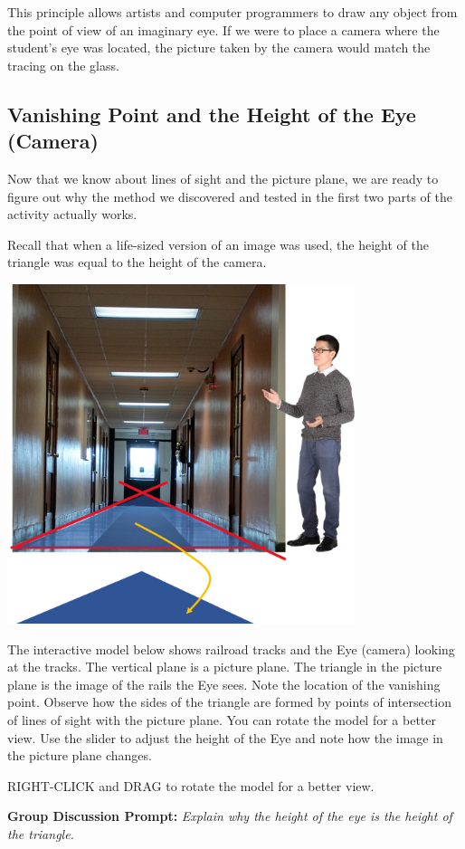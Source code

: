 \documentclass{ximera}
\begin{document}
This principle allows artists and computer programmers to draw any object from the point of view of an imaginary eye.  If we were to place a camera where the student's eye was located, the picture taken by the camera would match the tracing on the glass.

\subsection*{Vanishing Point and the Height of the Eye (Camera)}
Now that we know about lines of sight and the picture plane, we are ready to figure out why the method we discovered and tested in the first two parts of the activity actually works.

\begin{exploration}\label{exp:punchline}
Recall that when a life-sized version of an image was used, the height of the triangle was equal to the height of the camera.

\begin{image}
         \includegraphics[width=4in]{lifeSize.jpg}
\end{image}

The interactive model below shows railroad tracks and the Eye (camera) looking at the tracks. The vertical plane is a picture plane.  The triangle in the picture plane is the image of the rails the Eye sees.  Note the location of the vanishing point. Observe how the sides of the triangle are formed by points of intersection of lines of sight with the picture plane.  You can rotate the model for a better view.  Use the slider to adjust the height of the Eye and note how the image in the picture plane changes.  

RIGHT-CLICK and DRAG to rotate the model for a better view.
\begin{center}
\end{center}

\textbf{Group Discussion Prompt:}
\emph{Explain why the height of the eye is the height of the triangle.}
\end{exploration}
\end{document}
